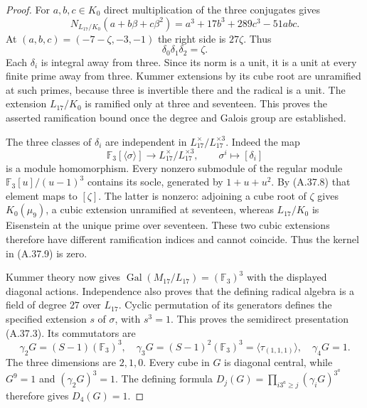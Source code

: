 \begin{proof}
For $a,b,c\in K_0$ direct multiplication of the three
conjugates gives
\[
 N_{L_{17}/K_0}(a+b\beta+c\beta^2)
       =a^3+17b^3+289c^3-51abc.
 \tag{A.37.7}
\]
At $(a,b,c)=(-7-\zeta,-3,-1)$ the right side is
$27\zeta$. Thus
\[
                    \delta_0\delta_1\delta_2=\zeta.
 \tag{A.37.8}
\]
Each $\delta_i$ is integral away from three. Since
its norm is a unit, it is a unit at every finite
prime away from three. Kummer extensions by its
cube root are unramified at such primes, because
three is invertible there and the radical is a unit.
The extension $L_{17}/K_0$ is ramified only at three
and seventeen. This proves the asserted ramification
bound once the degree and Galois group are established.

The three classes of $\delta_i$ are independent in
$L_{17}^{\times}/L_{17}^{\times3}$. Indeed the map
\[
 \mathbb F_3[\langle\sigma\rangle]
      \longrightarrow L_{17}^{\times}/L_{17}^{\times3},
 \qquad \sigma^i\longmapsto[\delta_i]
 \tag{A.37.9}
\]
is a module homomorphism. Every nonzero submodule
of the regular module
$\mathbb F_3[u]/(u-1)^3$ contains its socle,
generated by $1+u+u^2$. By (A.37.8) that element
maps to $[\zeta]$. The latter is nonzero: adjoining
a cube root of $\zeta$ gives $K_0(\mu_9)$, a cubic
extension unramified at seventeen, whereas
$L_{17}/K_0$ is Eisenstein at the unique prime over
seventeen. These two cubic extensions therefore have
different ramification indices and cannot coincide.
Thus the kernel in (A.37.9) is zero.

Kummer theory now gives
$\operatorname{Gal}(M_{17}/L_{17})=(\mathbb F_3)^3$
with the displayed diagonal actions. Independence
also proves that the defining radical algebra is a
field of degree $27$ over $L_{17}$. Cyclic permutation
of its generators defines the specified extension
$s$ of $\sigma$, with $s^3=1$. This proves the
semidirect presentation (A.37.3). Its commutators are
\[
 \gamma_2G=(S-1)(\mathbb F_3)^3,\quad
 \gamma_3G=(S-1)^2(\mathbb F_3)^3
       =\langle\tau_{(1,1,1)}\rangle,\quad
 \gamma_4G=1.
 \tag{A.37.10}
\]
The three dimensions are $2,1,0$. Every cube in
$G$ is diagonal central, while $G^9=1$ and
$(\gamma_2G)^3=1$. The defining formula
$D_j(G)=\prod_{i3^a\ge j}(\gamma_iG)^{3^a}$
therefore gives $D_4(G)=1$.


\end{proof}
